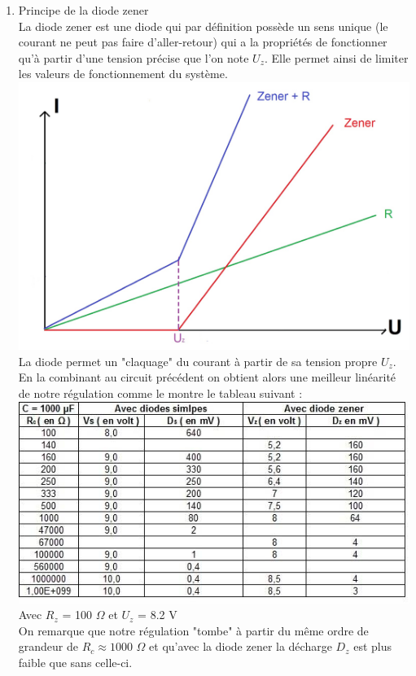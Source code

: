 \documentclass[12pt,a4paper]{article}
\begin{document}
\begin{enumerate}
\item Principe de la diode zener \\
La diode zener est une diode qui par définition possède un sens unique (le courant ne peut pas faire d'aller-retour) qui a la propriétés de fonctionner qu'à partir d'une tension précise que l'on note $U_z$. Elle permet ainsi de limiter les valeurs de fonctionnement du système.\\
\includegraphics[scale=0.2]{imtp2}\\
La diode permet un "claquage" du courant à partir de sa tension propre $U_z$. En la combinant au circuit précédent on obtient alors une meilleur linéarité de notre régulation comme le montre le tableau suivant :\\
\includegraphics[scale=0.7]{tab1}\\
Avec $R_z$ = 100 $\Omega$ et $U_z$ = 8.2 V\\
On remarque que notre régulation "tombe" à partir du même ordre de grandeur de $R_c \approx 1000$  $\Omega$ et qu'avec la diode zener la décharge $D_z$ est plus faible que sans celle-ci.

\end{enumerate}
\end{document}
